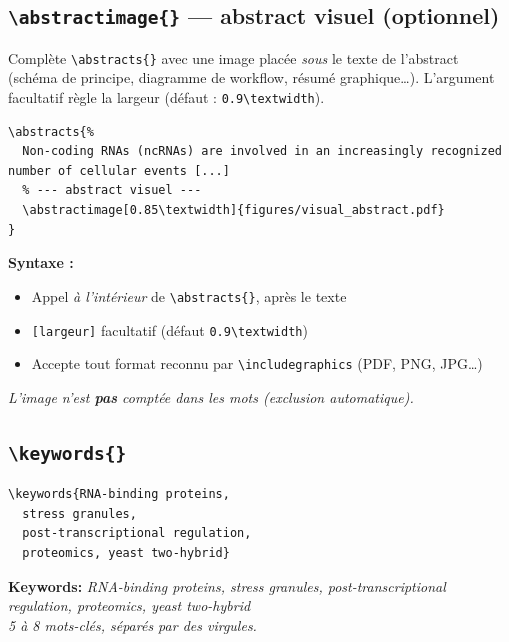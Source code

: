 \documentclass[12pt, a4paper]{article}
\begin{document}
\subsection[\texttt{\textbackslash abstractimage} — optionnel]{\texttt{\textbackslash abstractimage\{\}} — abstract visuel (optionnel)}

Complète \verb|\abstracts{}| avec une image placée \emph{sous} le texte de l'abstract (schéma de principe, diagramme de workflow, résumé graphique\ldots). L'argument facultatif règle la largeur (défaut : \texttt{0.9\textbackslash textwidth}).

\begin{demo}
\begin{lstlisting}[style=latexcode]
\abstracts{%
  Non-coding RNAs (ncRNAs) are involved in an increasingly recognized number of cellular events [...]
  % --- abstract visuel ---
  \abstractimage[0.85\textwidth]{figures/visual_abstract.pdf}
}
\end{lstlisting}
\tcblower
{\footnotesize\textbf{Syntaxe :}
\begin{itemize}[noitemsep, topsep=2pt]
  \item Appel \emph{à l'intérieur} de \verb|\abstracts{}|, après le texte
  \item \texttt{[largeur]} facultatif (défaut \texttt{0.9\textbackslash textwidth})
  \item Accepte tout format reconnu par \verb|\includegraphics| (PDF, PNG, JPG\ldots)
\end{itemize}
\medskip
\textit{L'image n'est \textbf{pas} comptée dans les mots (exclusion automatique).}}
\end{demo}

\subsection{\texttt{\textbackslash keywords\{\}}}

\begin{demo}
\begin{lstlisting}[style=latexcode]
\keywords{RNA-binding proteins,
  stress granules,
  post-transcriptional regulation,
  proteomics, yeast two-hybrid}
\end{lstlisting}
\tcblower
\small\textbf{Keywords:}
\textit{RNA-binding proteins, stress granules, post-transcriptional regulation, proteomics, yeast two-hybrid}\\[6pt]
{\footnotesize\itshape 5 à 8 mots-clés, séparés par des virgules.}
\end{demo}
\end{document}
